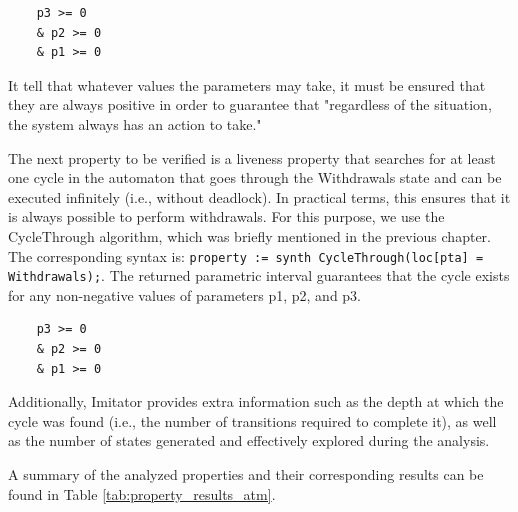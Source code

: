\begin{verbatim}
    p3 >= 0
    & p2 >= 0
    & p1 >= 0
\end{verbatim}

It tell that whatever values the parameters may take, it must be ensured that they are always positive in order to guarantee that "regardless of the situation, the system always has an action to take."

The next property to be verified is a liveness property that searches for at least one cycle in the automaton that goes through the Withdrawals state and can be executed infinitely (i.e., without deadlock). In practical terms, this ensures that it is always possible to perform withdrawals. For this purpose, we use the CycleThrough algorithm, which was briefly mentioned in the previous chapter. The corresponding syntax is: \texttt{property := synth CycleThrough(loc[pta] = Withdrawals);}. The returned parametric interval guarantees that the cycle exists for any non-negative values of parameters p1, p2, and p3.

\begin{verbatim}
    p3 >= 0
    & p2 >= 0
    & p1 >= 0
\end{verbatim}

Additionally, Imitator provides extra information such as the depth at which the cycle was found (i.e., the number of transitions required to complete it), as well as the number of states generated and effectively explored during the analysis.

A summary of the analyzed properties and their corresponding results can be found in Table \ref{tab:property_results_atm}.

